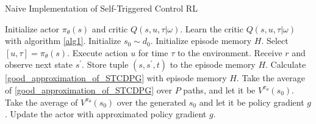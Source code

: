 \documentclass[english, dvipdfmx]{ampmt}             %
\begin{document}
\begin{algorithm}                      
\caption{Naive Implementation of Self-Triggered Control RL}         
\label{alg2}                          
\begin{algorithmic}                  
    \STATE Initialize actor $\pi_{\theta}(s)$ and critic $Q(s,u,\tau|\omega)$.
    \STATE Learn the critic $Q(s,u,\tau|\omega)$ with algorithm \ref{alg1}.
            \STATE Initialize $s_0\sim d_0$.
            \STATE Initialize episode memory $H$.
                \STATE Select $[u, \tau] = \pi_{\theta}(s)$.
                \STATE Execute action $u$ for time $\tau$ to the environment.
                \STATE Receive $r$ and observe next state $s^{\prime}$.
                \STATE Store tuple $(s, s^{\prime}, t)$ to the episode memory $H$.
            \ENDWHILE
            \STATE Calculate \eqref{good_approximation_of_STCDPG} with episode memory $H$.
        \ENDFOR
        \STATE Take the average of \eqref{good_approximation_of_STCDPG} over $P$ paths, and let it be $V^{\pi_{\theta}}(s_0)$.
        \ENDFOR
    \ENDFOR
    \STATE Take the average of $V^{\pi_{\theta}}(s_0)$ over the generated $s_0$ and let it be policy gradient $g$.
    \STATE Update the actor with approximated policy gradient $g$.
   \end{algorithmic}
\end{algorithm}
\end{document}
